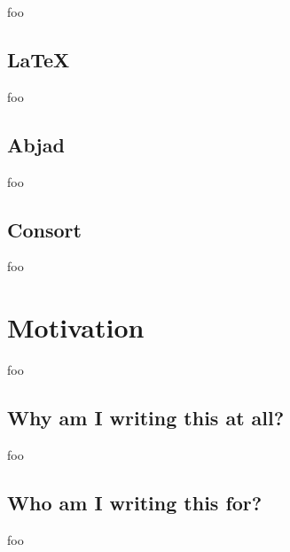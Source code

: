 foo

\subsection{LaTeX}

foo

\subsection{Abjad}

foo

\subsection{Consort}

foo

\section{Motivation}

foo

\subsection{Why am I writing this at all?}

foo

\subsection{Who am I writing this for?}

foo